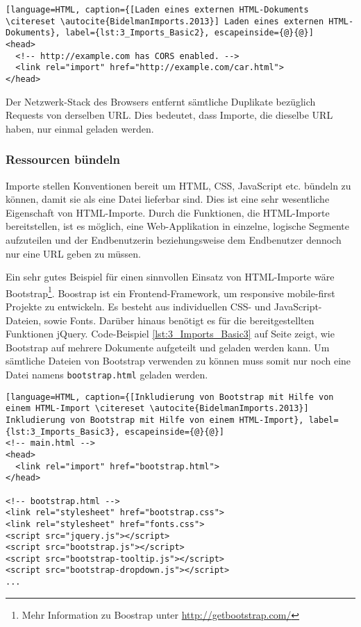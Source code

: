 \begin{lstlisting}[language=HTML, caption={[Laden eines externen HTML-Dokuments \citereset \autocite{BidelmanImports.2013}] Laden eines externen HTML-Dokuments}, label={lst:3_Imports_Basic2}, escapeinside={@}{@}]
<head>
  <!-- http://example.com has CORS enabled. -->
  <link rel="import" href="http://example.com/car.html">
</head>
\end{lstlisting}

Der Netzwerk-Stack des Browsers entfernt sämtliche Duplikate bezüglich Requests von derselben URL. Dies bedeutet, dass Importe, die dieselbe URL haben, nur einmal geladen werden.

\subsubsection{Ressourcen bündeln}

Importe stellen Konventionen bereit um HTML, CSS, JavaScript etc. bündeln zu können, damit sie als eine Datei lieferbar sind. Dies ist eine sehr wesentliche Eigenschaft von HTML-Importe. Durch die Funktionen, die HTML-Importe bereitstellen, ist es möglich, eine Web-Applikation in einzelne, logische Segmente aufzuteilen und der Endbenutzerin beziehungsweise dem Endbenutzer dennoch nur eine URL geben zu müssen.

Ein sehr gutes Beispiel für einen sinnvollen Einsatz von HTML-Importe wäre Bootstrap\footnote{Mehr Information zu Boostrap unter \href{http://getbootstrap.com/}{http://getbootstrap.com/}}. Boostrap ist ein Frontend-Framework, um responsive mobile-first Projekte zu entwickeln. Es besteht aus individuellen CSS- und JavaScript-Dateien, sowie Fonts. Darüber hinaus benötigt es für die bereitgestellten Funktionen jQuery. Code-Beispiel \ref{lst:3_Imports_Basic3} auf Seite \pageref{lst:3_Imports_Basic3} zeigt, wie Bootstrap auf mehrere Dokumente aufgeteilt und geladen werden kann. Um sämtliche Dateien von Bootstrap verwenden zu können muss somit nur noch eine Datei namens \lstinline|bootstrap.html| geladen werden.

\begin{lstlisting}[language=HTML, caption={[Inkludierung von Bootstrap mit Hilfe von einem HTML-Import \citereset \autocite{BidelmanImports.2013}] Inkludierung von Bootstrap mit Hilfe von einem HTML-Import}, label={lst:3_Imports_Basic3}, escapeinside={@}{@}]
<!-- main.html -->
<head>
  <link rel="import" href="bootstrap.html">
</head>

<!-- bootstrap.html -->
<link rel="stylesheet" href="bootstrap.css">
<link rel="stylesheet" href="fonts.css">
<script src="jquery.js"></script>
<script src="bootstrap.js"></script>
<script src="bootstrap-tooltip.js"></script>
<script src="bootstrap-dropdown.js"></script>
...
\end{lstlisting}

